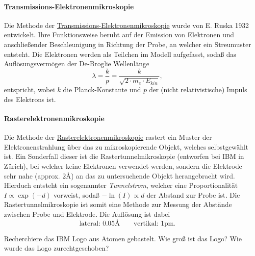 \documentclass{subfiles}
\begin{document}
        \paragraph*{Transmissions-Elektronenmikroskopie}
            Die Methode der \href{https://de.wikipedia.org/wiki/Transmissionselektronenmikroskop}{Transmissions-Elektronenmikroskopie} wurde von E. Ruska 1932 entwickelt. Ihre Funktionsweise beruht auf der Emission von Elektronen und anschließender Beschleunigung in Richtung der Probe, an welcher ein Streumuster entsteht. Die Elektronen werden als Teilchen im Modell aufgefasst, sodaß das Auflösungsvermögen der De-Broglie Wellenlänge 
            \[\lambda = \frac{k}{p} = \frac{k}{\sqrt{2\cdot m_e\cdot E_\textit{kin}}},\]
            entspricht, wobei $k$ die Planck-Konstante und $p$ der (nicht relativistische) Impuls des Elektrons ist.

        \paragraph*{Rasterelektronenmikroskopie}
            Die Methode der \href{https://de.wikipedia.org/wiki/Rasterelektronenmikroskopie}{Rasterelektronenmikroskopie} rastert ein Muster der Elektronenstrahlung über das zu mikroskopierende Objekt, welches selbstgewählt ist. Ein Sonderfall dieser ist die Rastertunnelmikroskopie (entworfen bei IBM in Zürich), bei welcher keine Elektronen verwendet werden, sondern die Elektrode sehr nahe (approx. $2\si\angstrom$) an das zu untersuchende Objekt herangebracht wird. Hierduch entsteht ein sogenannter \emph{Tunnelstrom}, welcher eine Proportionalität $I\propto \exp(-d)$ vorweist, sodaß $-\ln(I)\propto d$ der Abstand zur Probe ist. Die Rastertunnelmikroskopie ist somit eine Methode zur Messung der Abstände zwischen Probe und Elektrode. Die Auflösung ist dabei 
            \[\text{lateral: }0.05\si\angstrom \qquad\text{vertikal: }1\si{\pico\metre}.\]
            \begin{Aufgabe}
                \nr{} Recherchiere das IBM Logo aus Atomen gebastelt. Wie groß ist das Logo? Wie wurde das Logo zurechtgeschoben?
            \end{Aufgabe}
        
    
\end{document}
